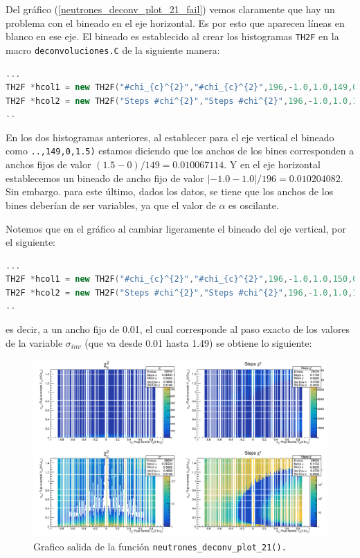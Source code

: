 \documentclass[11pt,letterpaper]{article}
\begin{document}
Del gráfico (\ref{neutrones_deconv_plot_21_fail}) vemos claramente que hay un problema con el bineado en el eje horizontal. Es por esto que aparecen líneas en blanco en ese eje. El bineado es establecido al crear los histogramas \verb|TH2F| en la macro  \verb|deconvoluciones.C| de la siguiente manera:

\begin{lstlisting}[language=c++]
...
TH2F *hcol1 = new TH2F("#chi_{c}^{2}","#chi_{c}^{2}",196,-1.0,1.0,149,0,1.5);
TH2F *hcol2 = new TH2F("Steps #chi^{2}","Steps #chi^{2}",196,-1.0,1.0,149,0,1.5);
..
\end{lstlisting}

En los dos histogramas anteriores, al establecer para el eje vertical el bineado como \verb|..,149,0,1.5)| estamos diciendo que los anchos de los bines corresponden a anchos fijos de valor $(1.5-0)/149 = 0.010067114$. Y en el eje horizontal establecemos un bineado de ancho fijo de valor $|-1.0-1.0|/196=0.010204082$. Sin embargo. para este último, dados los datos, se tiene que los anchos de los bines deberían de ser variables, ya que el valor de $\alpha$ es oscilante.

Notemos que en el gráfico al cambiar ligeramente el bineado del eje vertical, por el siguiente:

\begin{lstlisting}[language=c++]
...
TH2F *hcol1 = new TH2F("#chi_{c}^{2}","#chi_{c}^{2}",196,-1.0,1.0,150,0,1.5);
TH2F *hcol2 = new TH2F("Steps #chi^{2}","Steps #chi^{2}",196,-1.0,1.0,150,0,1.5);
..
\end{lstlisting}

 es decir, a un ancho fijo de 0.01, el cual corresponde al paso exacto de los valores de la variable $\sigma_{inv}$ (que va desde 0.01 hasta 1.49) se obtiene lo siguiente:
 
 \begin{figure}[H]
    \includegraphics[width=1.\textwidth]{img/plot_deconv_21_fail_02.png}
    \centering
     \cprotect\caption{Grafico salida de la función \verb|neutrones_deconv_plot_21().|} 
\label{neutrones_deconv_plot_21_fail_02}
\end{figure}
\end{document}
